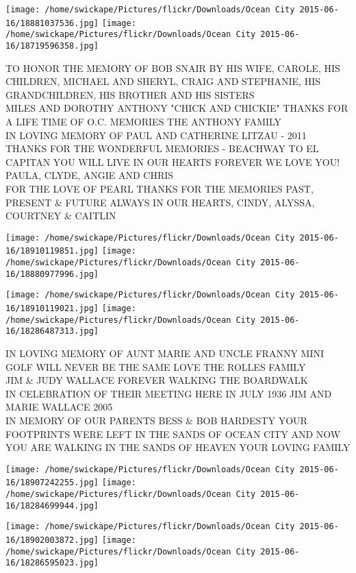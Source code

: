 \documentclass[10pt,letterpaper]{article}
\begin{document}
\texttt{[image: /home/swickape/Pictures/flickr/Downloads/Ocean City 2015-06-16/18881037536.jpg]}
\texttt{[image: /home/swickape/Pictures/flickr/Downloads/Ocean City 2015-06-16/18719596358.jpg]}

TO HONOR THE MEMORY OF BOB SNAIR BY HIS WIFE, CAROLE, HIS CHILDREN, MICHAEL AND SHERYL, CRAIG AND STEPHANIE, HIS GRANDCHILDREN, HIS BROTHER AND HIS SISTERS\\
MILES AND DOROTHY ANTHONY "CHICK AND CHICKIE" THANKS FOR A LIFE TIME OF O.C. MEMORIES THE ANTHONY FAMILY\\
IN LOVING MEMORY OF PAUL AND CATHERINE LITZAU {-} 2011 THANKS FOR THE WONDERFUL MEMORIES {-} BEACHWAY TO EL CAPITAN YOU WILL LIVE IN OUR HEARTS FOREVER WE LOVE YOU!  PAULA, CLYDE, ANGIE AND CHRIS\\
FOR THE LOVE OF PEARL THANKS FOR THE MEMORIES PAST, PRESENT \& FUTURE ALWAYS IN OUR HEARTS, CINDY, ALYSSA, COURTNEY \& CAITLIN\\
\pagebreak

\texttt{[image: /home/swickape/Pictures/flickr/Downloads/Ocean City 2015-06-16/18910119851.jpg]}
\texttt{[image: /home/swickape/Pictures/flickr/Downloads/Ocean City 2015-06-16/18880977996.jpg]}

\texttt{[image: /home/swickape/Pictures/flickr/Downloads/Ocean City 2015-06-16/18910119021.jpg]}
\texttt{[image: /home/swickape/Pictures/flickr/Downloads/Ocean City 2015-06-16/18286487313.jpg]}

IN LOVING MEMORY OF AUNT MARIE AND UNCLE FRANNY MINI GOLF WILL NEVER BE THE SAME LOVE THE ROLLES FAMILY\\
JIM \& JUDY WALLACE FOREVER WALKING THE BOARDWALK\\
IN CELEBRATION OF THEIR MEETING HERE IN JULY 1936 JIM AND MARIE WALLACE 2005\\
IN MEMORY OF OUR PARENTS BESS \& BOB HARDESTY YOUR FOOTPRINTS WERE LEFT IN THE SANDS OF OCEAN CITY AND NOW YOU ARE WALKING IN THE SANDS OF HEAVEN YOUR LOVING FAMILY\\
\pagebreak

\texttt{[image: /home/swickape/Pictures/flickr/Downloads/Ocean City 2015-06-16/18907242255.jpg]}
\texttt{[image: /home/swickape/Pictures/flickr/Downloads/Ocean City 2015-06-16/18284699944.jpg]}

\texttt{[image: /home/swickape/Pictures/flickr/Downloads/Ocean City 2015-06-16/18902003872.jpg]}
\texttt{[image: /home/swickape/Pictures/flickr/Downloads/Ocean City 2015-06-16/18286595023.jpg]}
\end{document}
